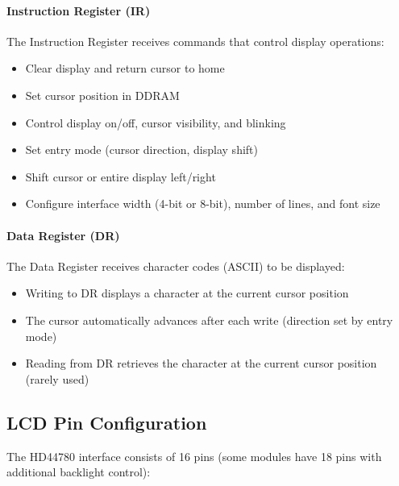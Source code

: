 \paragraph{Instruction Register (IR)}
The Instruction Register receives commands that control display operations:
\begin{itemize}[nosep]
  \item Clear display and return cursor to home
  \item Set cursor position in DDRAM
  \item Control display on/off, cursor visibility, and blinking
  \item Set entry mode (cursor direction, display shift)
  \item Shift cursor or entire display left/right
  \item Configure interface width (4-bit or 8-bit), number of lines, and font size
\end{itemize}

\paragraph{Data Register (DR)}
The Data Register receives character codes (ASCII) to be displayed:
\begin{itemize}[nosep]
  \item Writing to DR displays a character at the current cursor position
  \item The cursor automatically advances after each write (direction set by entry mode)
  \item Reading from DR retrieves the character at the current cursor position (rarely used)
\end{itemize}

\subsection{LCD Pin Configuration}

The HD44780 interface consists of 16 pins (some modules have 18 pins with additional backlight control):

